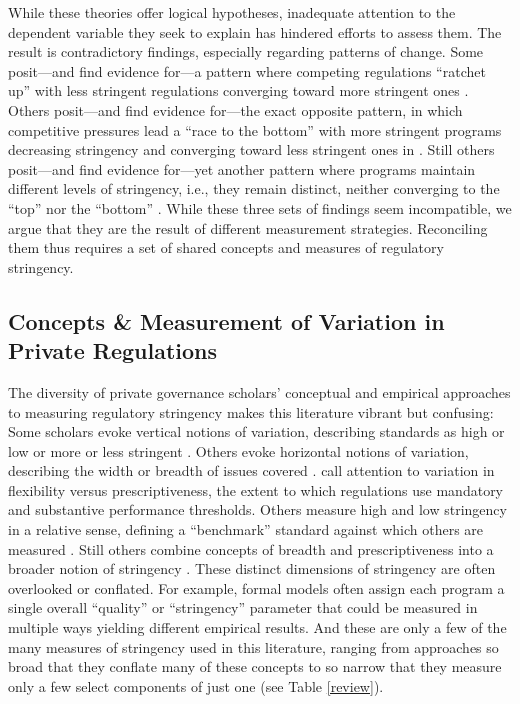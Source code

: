 \documentclass[
      12pt,
            Review ]{article}
\begin{document}
While these theories offer logical hypotheses, inadequate attention to the dependent variable they seek to explain has hindered efforts to assess them. The result is contradictory findings, especially regarding patterns of change. Some posit---and find evidence for---a pattern where competing regulations ``ratchet up'' with less stringent regulations converging toward more stringent ones \citep{Overdevest2005, Overdevest2010, Overdevest2014}. Others posit---and find evidence for---the exact opposite pattern, in which competitive pressures lead a ``race to the bottom'' with more stringent programs decreasing stringency and converging toward less stringent ones in \citep{Abbott2010, Fransen2011, Gulbrandsen2004}. Still others posit---and find evidence for---yet another pattern where programs maintain different levels of stringency, i.e., they remain distinct, neither converging to the ``top'' nor the ``bottom'' \citep{Cashore2004}. While these three sets of findings seem incompatible, we argue that they are the result of different measurement strategies. Reconciling them thus requires a set of shared concepts and measures of regulatory stringency.

\hypertarget{concepts-measurement-of-variation-in-private-regulations}{%
\subsection{Concepts \& Measurement of Variation in Private Regulations}\label{concepts-measurement-of-variation-in-private-regulations}}

The diversity of private governance scholars' conceptual and empirical approaches to measuring regulatory stringency makes this literature vibrant but confusing: Some scholars evoke vertical notions of variation, describing standards as high or low or more or less stringent \citep{Fischer2014, Li2015}. Others evoke horizontal notions of variation, describing the width or breadth of issues covered \citep{Auld2014, Heyes2017}. \citet{Cashore2007} call attention to variation in flexibility versus prescriptiveness, the extent to which regulations use mandatory and substantive performance thresholds. Others measure high and low stringency in a relative sense, defining a ``benchmark'' standard against which others are measured \citep{Overdevest2005, Overdevest2010}. Still others combine concepts of breadth and prescriptiveness into a broader notion of stringency \citep{Fransen2011}. These distinct dimensions of stringency are often overlooked or conflated. For example, formal models often assign each program a single overall ``quality'' or ``stringency'' parameter that could be measured in multiple ways yielding different empirical results. And these are only a few of the many measures of stringency used in this literature, ranging from approaches so broad that they conflate many of these concepts to so narrow that they measure only a few select components of just one (see Table \ref{review}).
\end{document}
